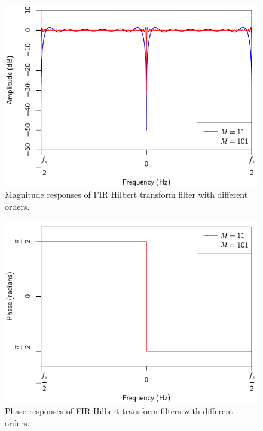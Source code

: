 			\begin{figure}[h!]
				\centering
				\includegraphics{chapter2/Images/HilbertMagnitudeResponses.pdf}
				\caption{Magnitude responses of FIR Hilbert transform filter with different orders.}
				\label{fig:HilbertMagnitude}
			\end{figure}

			\begin{figure}[h!]
				\centering
				\includegraphics{chapter2/Images/HilbertPhaseResponses.pdf}
				\caption{Phase responses of FIR Hilbert transform filters with different orders.}
				\label{fig:HilbertPhase}
			\end{figure}

